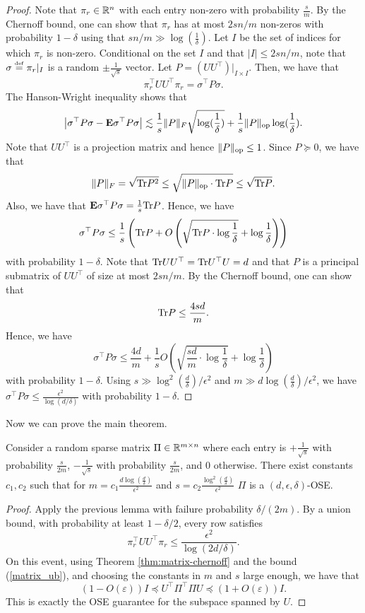 \begin{proof}
Note that $\pi_{r}\in\mathbb{R}^{n}$ with each entry non-zero with probability
$\frac{s}{m}$. By the Chernoff bound, one can show that $\pi_{r}$
has at most $2sn/m$ non-zeros with probability $1-\delta$ using
that $sn/m\gg\log(\frac{1}{\delta})$. Let $I$ be the set of indices
for which $\pi_{r}$ is non-zero. Conditional on the set $I$ and
that $|I|\leq2sn/m$, note that $\sigma\stackrel{\mathrm{{\scriptscriptstyle def}}}{=}\pi_{r}|_{I}$ is a random
$\pm\frac{1}{\sqrt{s}}$ vector. Let $P=(UU^{\top})|_{I\times I}$.
Then, we have that
\[
\pi^{\top}_{r}UU^{\top}\pi_{r}=\sigma^{\top}P\sigma.
\]
The Hanson-Wright inequality shows that
\[
\left|\sigma^{\top}P\sigma-\mathbf{E}\sigma^{\top}P\sigma\right|\lesssim\frac{1}{s}\|P\|_{F}\sqrt{\log(\frac{1}{\delta})}+\frac{1}{s}\|P\|_{\mathrm{op}}\log(\frac{1}{\delta}).
\]
Note that $UU^{\top}$ is a projection matrix and hence $\|P\|_{\mathrm{op}}\leq1$.
Since $P\succeq0$, we have that
\[
\|P\|_{F}=\sqrt{\mathrm{Tr} P^{2}}\leq\sqrt{\|P\|_{\mathrm{op}}\cdot\mathrm{Tr} P}\leq\sqrt{\mathrm{Tr} P}.
\]
Also, we have that $\mathbf{E}\sigma^{\top}P\sigma=\frac{1}{s}\mathrm{Tr} P$. Hence,
we have
\[
\sigma^{\top}P\sigma\leq\frac{1}{s}\left(\mathrm{Tr} P+O\left(\sqrt{\mathrm{Tr} P\cdot\log\frac{1}{\delta}}+\log\frac{1}{\delta}\right)\right)
\]
with probability $1-\delta$. Note that $\mathrm{Tr} UU^{\top}=\mathrm{Tr} U^{\top}U=d$
and that $P$ is a principal submatrix of $UU^{\top}$ of size at
most $2sn/m$. By the Chernoff bound, one can show that
\[
\mathrm{Tr} P\leq\frac{4sd}{m}.
\]
Hence, we have
\[
\sigma^{\top}P\sigma\leq\frac{4d}{m}+\frac{1}{s}O\left(\sqrt{\frac{sd}{m}\cdot\log\frac{1}{\delta}}+\log\frac{1}{\delta}\right)
\]
with probability $1-\delta$. Using $s\gg\log^{2}(\frac{d}{\delta})/\epsilon^{2}$
and $m\gg d\log(\frac{d}{\delta})/\epsilon^{2}$, we have $\sigma^{\top}P\sigma\leq\frac{\epsilon^{2}}{\log(d/\delta)}$
with probability $1-\delta$.
\end{proof}
Now we can prove the main theorem.
\begin{thm}
\label{thm:sparse_OSE}Consider a random sparse matrix $\Pi\in\mathbb{R}^{m\times n}$
where each entry is $+\frac{1}{\sqrt{s}}$ with probability $\frac{s}{2m}$,
$-\frac{1}{\sqrt{s}}$ with probability $\frac{s}{2m}$, and $0$
otherwise. There exist constants $c_{1},c_{2}$ such that for $m=c_{1}\frac{d\log(\frac{d}{\delta})}{\epsilon^{2}}$
and $s=c_{2}\frac{\log^{2}(\frac{d}{\delta})}{\epsilon^{2}}$ $\Pi$
is a $(d,\epsilon,\delta)$-OSE.
\end{thm}

\begin{proof}
Apply the previous lemma with failure probability $\delta/(2m)$.
By a union bound, with probability at least $1-\delta/2$, every row
satisfies
\[
\pi^{\top}_{r}UU^{\top}\pi_{r}\leq\frac{\epsilon^{2}}{\log(2d/\delta)}.
\]
On this event, using Theorem \ref{thm:matrix-chernoff} and the bound
(\ref{matrix_ub}), and choosing the constants in $m$ and $s$ large
enough, we have that
\[
(1-O(\varepsilon))I\preceq U^{\top}\Pi^{\top}\Pi U\preceq(1+O(\varepsilon))I.
\]
This is exactly the OSE guarantee for the subspace spanned by $U$.
\end{proof}

